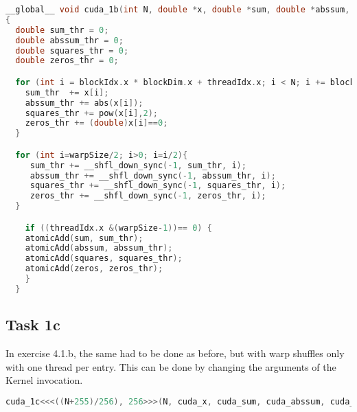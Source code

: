 \begin{lstlisting}[language=C++, title=C++ Cuda Code for 1b Kernel]
__global__ void cuda_1b(int N, double *x, double *sum, double *abssum, double *squares, double *zeros)
{
  double sum_thr = 0;
  double abssum_thr = 0;
  double squares_thr = 0;
  double zeros_thr = 0;

  for (int i = blockIdx.x * blockDim.x + threadIdx.x; i < N; i += blockDim.x * gridDim.x) {
    sum_thr  += x[i];
    abssum_thr += abs(x[i]);
    squares_thr += pow(x[i],2);
    zeros_thr += (double)x[i]==0;
  }

  for (int i=warpSize/2; i>0; i=i/2){
     sum_thr += __shfl_down_sync(-1, sum_thr, i);
     abssum_thr += __shfl_down_sync(-1, abssum_thr, i);
     squares_thr += __shfl_down_sync(-1, squares_thr, i);
     zeros_thr += __shfl_down_sync(-1, zeros_thr, i);
  }

    if ((threadIdx.x &(warpSize-1))== 0) {
    atomicAdd(sum, sum_thr);
    atomicAdd(abssum, abssum_thr);
    atomicAdd(squares, squares_thr);
    atomicAdd(zeros, zeros_thr);
    }
  }
\end{lstlisting}


\subsection{Task 1c}

In exercise 4.1.b, the same had to be done as before, but with warp shuffles only with one thread per entry. This can be done by changing
the arguments of the Kernel invocation.

\begin{lstlisting}[language=C++, title=C++ Cuda Code for 1c Kernel Invocation]
    cuda_1c<<<((N+255)/256), 256>>>(N, cuda_x, cuda_sum, cuda_abssum, cuda_squares, cuda_zeros);
\end{lstlisting}



\pagebreak

